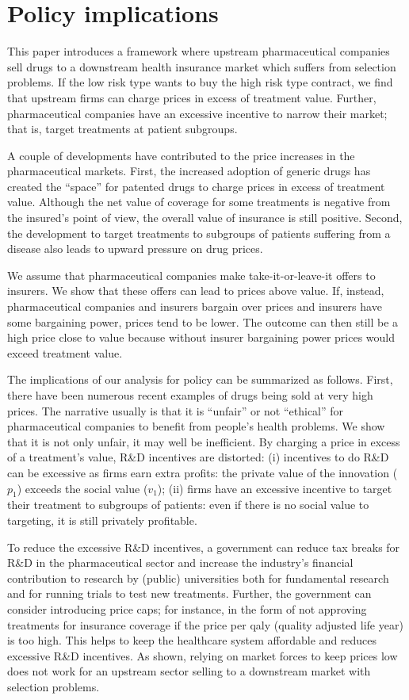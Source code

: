 \documentclass[a4paper,12pt]{article}
\begin{document}
\section{Policy implications}
\label{sec:orga9892b6}

This paper introduces a framework where upstream pharmaceutical companies sell drugs to a downstream health insurance market which suffers from selection problems. If the low risk type wants to buy the high risk type contract, we find that upstream firms can charge prices in excess of treatment value. Further, pharmaceutical companies have an excessive incentive to narrow their market; that is, target treatments at patient subgroups.

A couple of developments have contributed to the price increases in the pharmaceutical markets. First, the increased adoption of generic drugs has created the ``space'' for patented drugs to charge prices in excess of treatment value. Although the net value of coverage for some treatments is negative from the insured's point of view, the overall value of insurance is still positive. Second, the development to target treatments to subgroups of patients suffering from a disease also leads to upward pressure on drug prices. 

We assume that pharmaceutical companies make take-it-or-leave-it offers to insurers. We show that these offers can lead to prices above value. If, instead, pharmaceutical companies and insurers bargain over prices and insurers have some bargaining power, prices tend to be lower. The outcome can then still be a high price close to value because without insurer bargaining power prices would exceed treatment value.

The implications of our analysis for policy can be summarized as follows. First, there have been numerous recent examples of drugs being sold at very high prices. The narrative usually is that it is ``unfair'' or not ``ethical'' for pharmaceutical companies to benefit from people's health problems. We show that it is not only unfair, it may well be inefficient. By charging a price in excess of a treatment's value, R\&D incentives are distorted: (i) incentives to do R\&D can be excessive as firms earn extra profits: the private value of the innovation (\(p_1\)) exceeds the social value (\(v_1\)); (ii) firms have an excessive incentive to target their treatment to subgroups of patients: even if there is no social value to targeting, it is still privately profitable.

To reduce the excessive R\&D incentives, a government can reduce tax breaks for R\&D in the pharmaceutical sector and increase the industry's financial contribution to research by (public) universities both for fundamental research and for running trials to test new treatments. Further, the government can consider introducing price caps; for instance, in the form of not approving treatments for insurance coverage if the price per qaly (quality adjusted life year) is too high. This helps to keep the healthcare system affordable and reduces excessive R\&D incentives. As shown, relying on market forces to keep prices low does not work for an upstream sector selling to a downstream market with selection problems.
\end{document}
